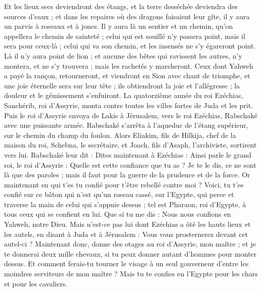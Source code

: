 \begin{multicols}{2}
Et les lieux secs deviendront des étangs, et la terre desséchée deviendra des sources d'eaux ; et dans les repaires où des dragons faisaient leur gîte, il y aura un parvis à roseaux et à joncs.
Il y aura là un sentier et un chemin, qu'on appellera le chemin de sainteté ; celui qui est souillé n'y passera point, mais il sera pour ceux-là ; celui qui va son chemin, et les insensés ne s'y égareront point.
Là il n'y aura point de lion ; et aucune des bêtes qui ravissent les autres, n'y montera, et ne s'y trouvera ; mais les rachetés y marcheront.
Ceux dont Yahweh a payé la rançon, retourneront, et viendront en Sion avec chant de triomphe, et une joie éternelle sera sur leur tête ; ils obtiendront la joie et l'allégresse ; la douleur et le gémissement s'enfuiront.
\VerseOne{}La quatorzième année du roi Ezéchias, Sanchérib, roi d'Assyrie, monta contre toutes les villes fortes de Juda et les prit.
Puis le roi d'Assyrie envoya de Lakis à Jérusalem, vers le roi Ezéchias, Rabschaké avec une puissante armée. Rabschaké s'arrêta à l'aqueduc de l'étang supérieur, sur le chemin du champ du foulon.
Alors Eliakim, fils de Hilkija, chef de la maison du roi, Schebna, le secrétaire, et Joach, fils d'Asaph, l'archiviste, sortirent vers lui.
Rabschaké leur dit : Dites maintenant à Ezéchias : Ainsi parle le grand roi, le roi d'Assyrie : Quelle est cette confiance que tu as ?
Je te le dis, ce ne sont là que des paroles ; mais il faut pour la guerre de la prudence et de la force. Or maintenant en qui t'es tu confié pour t'être rebellé contre moi ?
Voici, tu t'es confié sur ce bâton qui n'est qu'un roseau cassé, sur l'Egypte, qui perce et traverse la main de celui qui s'appuie dessus ; tel est Pharaon, roi d'Egypte, à tous ceux qui se confient en lui.
Que si tu me dis : Nous nous confions en Yahweh, notre Dieu. Mais n'est-ce pas lui dont Ezéchias a ôté les hauts lieux et les autels, en disant à Juda et à Jérusalem : Vous vous prosternerez devant cet autel-ci ?
Maintenant donc, donne des otages au roi d'Assyrie, mon maître ; et je te donnerai deux mille chevaux, si tu peux donner autant d'hommes pour monter dessus.
Et comment ferais-tu tourner le visage à un seul gouverneur d'entre les moindres serviteurs de mon maître ? Mais tu te confies en l'Egypte pour les chars et pour les cavaliers.

\end{multicols}
